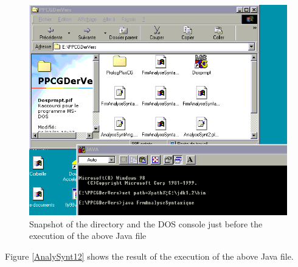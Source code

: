 \documentclass{book}
\begin{document}
\begin{htmlonly}

\begin{figure}
\begin{center}
\includegraphics{AppelAnalSynt.png}
\end{center}
\caption{\label{AppelAnalSynt}Snapshot of the directory and the DOS
console just before the execution of the above Java file}
\end{figure}

\end{htmlonly}



Figure \ref{AnalySynt12} shows the result of the execution of the
above Java file.
\end{document}
